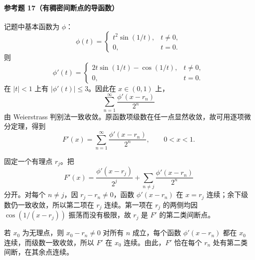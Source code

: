 \paragraph{参考题 17（有稠密间断点的导函数）}
\begin{xsolution}
记题中基本函数为 $\phi$：
\[
  \phi(t)=
  \begin{cases}
    t^2\sin(1/t),&t\ne0,\\
    0,&t=0.
  \end{cases}
\]
则
\[
  \phi'(t)=
  \begin{cases}
    2t\sin(1/t)-\cos(1/t),&t\ne0,\\
    0,&t=0.
  \end{cases}
\]
在 $|t|<1$ 上有 $|\phi'(t)|\leqslant3$。因此在 $x\in(0,1)$ 上，
\[
  \sum_{n=1}^{\infty}\frac{\phi'(x-r_n)}{2^n}
\]
由 Weierstrass 判别法一致收敛。原函数项级数在任一点显然收敛，故可用逐项微分定理，得到
\[
  F'(x)=\sum_{n=1}^{\infty}\frac{\phi'(x-r_n)}{2^n},
  \qquad0<x<1.
\]

固定一个有理点 $r_j$。把
\[
  F'(x)=\frac{\phi'(x-r_j)}{2^j}
  +\sum_{n\ne j}\frac{\phi'(x-r_n)}{2^n}
\]
分开。对每个 $n\ne j$，因 $r_j-r_n\ne0$，函数 $\phi'(x-r_n)$ 在 $x=r_j$ 连续；余下级数仍一致收敛，所以第二项在 $r_j$ 连续。第一项在 $r_j$ 的两侧均因 $\cos(1/(x-r_j))$ 振荡而没有极限，故 $r_j$ 是 $F'$ 的第二类间断点。

若 $x_0$ 为无理点，则 $x_0-r_n\ne0$ 对所有 $n$ 成立，每个函数 $\phi'(x-r_n)$ 都在 $x_0$ 连续，而级数一致收敛，所以 $F'$ 在 $x_0$ 连续。由此，$F'$ 恰在每个 $r_n$ 处有第二类间断，在其余点连续。
\end{xsolution}
